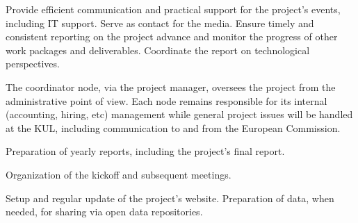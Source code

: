 \begin{workpackage}[id=management,type=MGT,wphases=0-48!.2,
  title=Project Management,short=Management,
  lead=KUL,KULRM=24]

\begin{wpobjectives}

Provide efficient communication and practical support for the project's events,
including IT support.
%
Serve as contact for the media.
%
Ensure timely and consistent reporting on the project advance and monitor the
progress of other work packages and deliverables.
%
Coordinate the report on technological perspectives.

\end{wpobjectives}

\begin{wpdescription}

The coordinator node, via the project manager, oversees the project from the
administrative point of view. Each node remains responsible for its internal
(accounting, hiring, etc) management while general project issues will be
handled at the KUL, including communication to and from the European Commission.

\end{wpdescription}

\begin{tasklist}
\begin{task}[title=Reporting,id=mgt-reporting,lead=KUL,PM=6,wphases=0-48!0.125]

Preparation of yearly reports, including the project's final report.

\end{task}

\begin{task}[title=Meetings,id=mgt-meetings,lead=KUL,PM=6,wphases=0-48!0.125]

Organization of the kickoff and subsequent meetings.

\end{task}

\begin{task}[title=IT,id=mgt-IT,lead=KUL,PM=6,wphases=0-48!0.125]

Setup and regular update of the project's website.
%
Preparation of data, when needed, for sharing via open data repositories.

\end{task}

\begin{task}[title=comm,id=mgt-comm,lead=KUL,PM=6,wphases=0-48!0.125]


\end{task}
\end{tasklist}
\end{workpackage}
